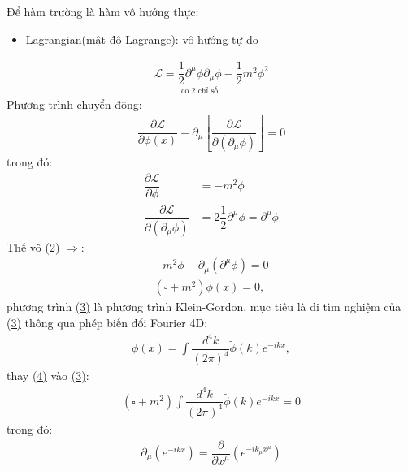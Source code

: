 \documentclass{report}
\begin{document}
Để hàm trường là hàm vô hướng thực:
\begin{itemize}
	\item Lagrangian(mật độ Lagrange): vô hướng tự do
\end{itemize}
\begin{align}
	\mathcal{L}=\underset{\text{co 2 chỉ số}}{\dfrac{1}{2}\partial^\mu\phi\partial_\mu\phi}  - \dfrac{1}{2}m^2\phi^2
\end{align}
Phương trình chuyển động:
\begin{align}
	\dfrac{\partial\mathcal{L}}{\partial\phi(x)} - \partial_\mu \left[\dfrac{\partial\mathcal{L}}{\partial(\partial_\mu\phi)}\right] = 0\label{eq2}
\end{align}
trong đó:
\begin{align*}
	\dfrac{\partial\mathcal{L}}{\partial\phi}&= -m^2\phi\\
	\dfrac{\partial\mathcal{L}}{\partial(\partial_\mu\phi)}&=2\dfrac{1}{2}\partial^\mu\phi = \partial^\mu\phi
\end{align*}
Thế vô \hyperref[eq2]{(2)} $\Rightarrow$:
\begin{align}
	-m^2\phi - \partial_\mu(\partial^\mu\phi) = 0 \nonumber\\
	(\square + m^2)\phi(x) = 0,\label{eq3}
\end{align}
phương trình \hyperref[eq3]{(3)} là phương trình Klein-Gordon, mục tiêu là đi tìm nghiệm của \hyperref[eq3]{(3)} thông qua phép biến đổi Fourier 4D:
\begin{align}
	\phi(x) = \int \dfrac{d^4k}{(2\pi)^4}\tilde{\phi}(k) e^{-ikx}, \label{eq4}
\end{align}
thay \hyperref[eq4]{(4)} vào \hyperref[eq3]{(3)}:
\begin{align*}
	(\square + m^2)\int \dfrac{d^4k}{(2\pi)^4}\tilde{\phi}(k) e^{-ikx}= 0
\end{align*}
trong đó:
\begin{align*}
	\partial_\mu(e^{-ikx}) =\dfrac{\partial}{\partial x^\mu}(e^{-ik_\mu x^\mu})
\end{align*}
\end{document}
